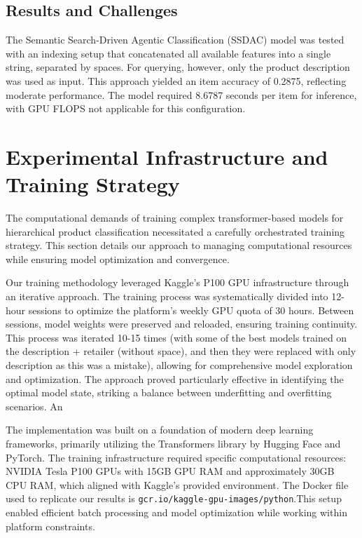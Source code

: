 \documentclass[9pt,a4paper,twoside]{rho-class/rho}
\begin{document}
    \subsection{Results and Challenges}
    The Semantic Search-Driven Agentic Classification (SSDAC) model was tested with an indexing setup that concatenated all available features into a single string, separated by spaces. For querying, however, only the product description was used as input. This approach yielded an item accuracy of 0.2875, reflecting moderate performance. The model required 8.6787 seconds per item for inference, with GPU FLOPS not applicable for this configuration.
    

\section{Experimental Infrastructure and Training Strategy}

    The computational demands of training complex transformer-based models for hierarchical product classification necessitated a carefully orchestrated training strategy. This section details our approach to managing computational resources while ensuring model optimization and convergence.
    
    Our training methodology leveraged Kaggle's P100 GPU infrastructure through an iterative approach. The training process was systematically divided into 12-hour sessions to optimize the platform's weekly GPU quota of 30 hours. Between sessions, model weights were preserved and reloaded, ensuring training continuity. This process was iterated 10-15 times (with some of the best models trained on the description + retailer (without space), and then they were replaced with only description as this was a mistake), allowing for comprehensive model exploration and optimization. The approach proved particularly effective in identifying the optimal model state, striking a balance between underfitting and overfitting scenarios. An
    
    The implementation was built on a foundation of modern deep learning frameworks, primarily utilizing the Transformers library by Hugging Face and PyTorch. The training infrastructure required specific computational resources: NVIDIA Tesla P100 GPUs with 15GB GPU RAM and approximately 30GB CPU RAM, which aligned with Kaggle's provided environment. The Docker file used to replicate our results is \texttt{gcr.io/kaggle-gpu-images/python}.This setup enabled efficient batch processing and model optimization while working within platform constraints.
\end{document}
